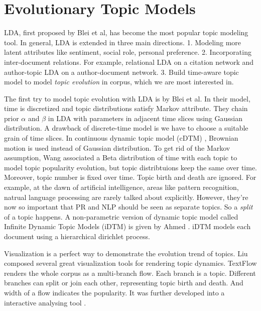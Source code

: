 \section {Evolutionary Topic Models}
LDA, first proposed by Blei et al,\cite{blei2003latent} has become the most popular topic modeling tool. In general, LDA is extended in three main directions. 1. Modeling more latent attributes like sentiment, social role, personal preference. 2. Incorporating inter-document relations. For example, relational LDA\cite{chang2009relational} on a citation network and author-topic LDA\cite{rosen2004author} on a author-document network. 3. Build time-aware topic model to model {\em topic evolution} in corpus, which we are most interested in.

The first try to model topic evolution with LDA is by Blei et al\cite{blei2006dynamic}. In their model, time is discretized and topic distributions satisfy Markov attribute. They chain prior $\alpha$ and $\beta$ in LDA with parameters in adjacent time slices using Gaussian distribution. A drawback of discrete-time model is we have to choose a suitable grain of time slices. In continuous dynamic topic model (cDTM) \cite{wang2012continuous}, Brownian motion is used instead of Gaussian distribution. To get rid of the Markov assumption, Wang \cite{wang2006topics} associated a Beta distribution of time with each topic to model topic popularity evolution, but topic distribtuions keep the same over time. Moreover, topic number is fixed over time. Topic birth and death are ignored. For example, at the dawn of artificial intelligence, areas like pattern recognition, natrual language processing are rarely talked about explicitly. However, they're now so important that PR and NLP should be seen as separate topics. So a {\em split} of a topic happens. A non-parametric version of dynamic topic model called Infinite Dynamic Topic Models (iDTM) is given by Ahmed \cite{ahmed2012timeline}. iDTM models each document using a hierarchical dirichlet process.

Visualization is a perfect way to demonstrate the evolution trend of topics. Liu composed several great visualization tools for rendering topic dynamics. TextFlow \cite{cui2011textflow} renders the whole corpus as a multi-branch flow. Each branch is a topic. Different branches can split or join each other, representing topic birth and death. And width of a flow indicates the popularity. It was further developed into a interactive analysing tool \cite{liu2009interactive}.

